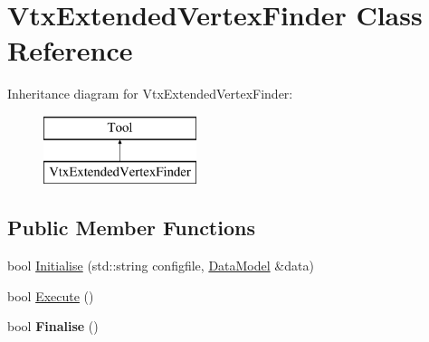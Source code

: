 \hypertarget{classVtxExtendedVertexFinder}{\section{Vtx\-Extended\-Vertex\-Finder Class Reference}
\label{classVtxExtendedVertexFinder}
}
Inheritance diagram for Vtx\-Extended\-Vertex\-Finder\-:\begin{figure}[H]
\begin{center}
\leavevmode
\includegraphics[height=2.000000cm]{classVtxExtendedVertexFinder}
\end{center}
\end{figure}
\subsection*{Public Member Functions}
\begin{DoxyCompactItemize}
\item 
bool \hyperlink{classVtxExtendedVertexFinder_ac63dc8b1621acfdf80a1bc40101db02b}{Initialise} (std\-::string configfile, \hyperlink{classDataModel}{Data\-Model} \&data)
\item 
bool \hyperlink{classVtxExtendedVertexFinder_aa1d2b2a105f7a63498ab1d58ffed7acf}{Execute} ()
\item 
\hypertarget{classVtxExtendedVertexFinder_aac62092862d79d5dc0383636748a2b75}{bool {\bfseries Finalise} ()}\label{classVtxExtendedVertexFinder_aac62092862d79d5dc0383636748a2b75}

\end{DoxyCompactItemize}


